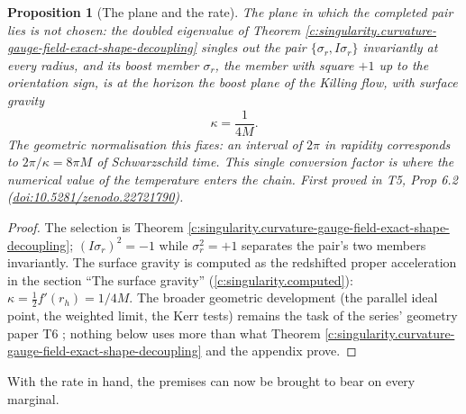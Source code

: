 \documentclass[11pt]{article}
\newtheorem{proposition}[theorem]{Proposition}
\theoremstyle{definition}
\theoremstyle{plain}
\begin{document}
\begin{proposition}[The plane and the rate]\label{c:singularity.plane-rate}
The plane in which the completed pair lies is not chosen: the doubled eigenvalue of Theorem \ref{c:singularity.curvature-gauge-field-exact-shape-decoupling} singles out the pair $\{\sigma_r, I\sigma_r\}$ invariantly at every radius, and its boost member $\sigma_r$, the member with square $+1$ up to the orientation sign, is at the horizon the boost plane of the Killing flow, with surface gravity
\[
\kappa = \frac{1}{4M} .
\]
The geometric normalisation this fixes: an interval of $2\pi$ in rapidity corresponds to $2\pi/\kappa = 8\pi M$ of Schwarzschild time. This single conversion factor is where the numerical value of the temperature enters the chain.
\emph{First proved in} T5, Prop 6.2 (\href{https://doi.org/10.5281/zenodo.22721790}{doi:10.5281/zenodo.22721790}).
\end{proposition}
\begin{proof}
The selection is Theorem \ref{c:singularity.curvature-gauge-field-exact-shape-decoupling}; $(I\sigma_r)^2 = -1$ while $\sigma_r^2 = +1$ separates the pair's two members invariantly. The surface gravity is computed as the redshifted proper acceleration in the section ``The surface gravity'' (\ref{c:singularity.computed}): $\kappa = \tfrac12 f'(r_h) = 1/4M$. The broader geometric development (the parallel ideal point, the weighted limit, the Kerr tests) remains the task of the series' geometry paper T6 \cite{ButlerT6}; nothing below uses more than what Theorem \ref{c:singularity.curvature-gauge-field-exact-shape-decoupling} and the appendix prove.

\end{proof}

With the rate in hand, the premises can now be brought to bear on every marginal.
\end{document}
